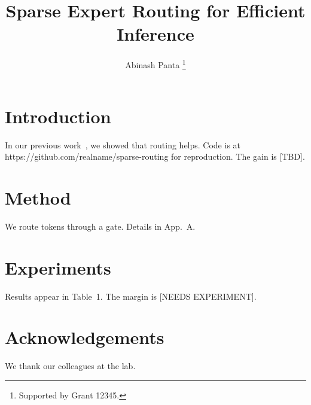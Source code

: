 \documentclass{article}
\title{Sparse Expert Routing for Efficient Inference}
\author{Abinash Panta \thanks{Supported by Grant 12345.}}
\begin{document}
\maketitle
\section{Introduction}
In our previous work~\cite{ours23}, we showed that routing helps. Code is at
https://github.com/realname/sparse-routing for reproduction. The gain is [TBD].
\section{Method}
We route tokens through a gate. Details in App.~A.
\section{Experiments}
Results appear in Table~1. The margin is [NEEDS EXPERIMENT].
\section{Acknowledgements}
We thank our colleagues at the lab.

\end{document}
